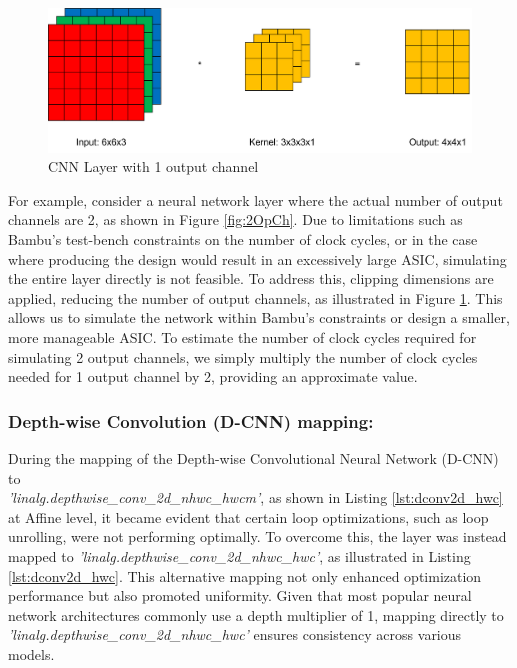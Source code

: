 \begin{figure}[H]
    \centering
    \includegraphics[width=0.7\linewidth]{figure//chapter3_implementation/Figure 7 - output channels 1.png}
    \caption{CNN Layer with 1 output channel}
    \label{fig:1OpCh}
\end{figure}

For example, consider a neural network layer where the actual number of output channels are 2, as shown in Figure \ref{fig:2OpCh}. Due to limitations such as Bambu's test-bench constraints on the number of clock cycles, or in the case where producing the design would result in an excessively large ASIC, simulating the entire layer directly is not feasible. To address this, clipping dimensions are applied, reducing the number of output channels, as illustrated in Figure \ref{fig:1OpCh}. This allows us to simulate the network within Bambu’s constraints or design a smaller, more manageable ASIC. To estimate the number of clock cycles required for simulating 2 output channels, we simply multiply the number of clock cycles needed for 1 output channel by 2, providing an approximate value.

\subsubsection{Depth-wise Convolution (D-CNN) mapping:}

During the mapping of the Depth-wise Convolutional Neural Network (D-CNN) to \\ \textit{'linalg.depthwise\_conv\_2d\_nhwc\_hwcm'}, as shown in Listing \ref{lst:dconv2d_hwc} at Affine level, it became evident that certain loop optimizations, such as loop unrolling, were not performing optimally. To overcome this, the layer was instead mapped to \textit{'linalg.depthwise\_conv\_2d\_nhwc\_hwc'}, as illustrated in Listing \ref{lst:dconv2d_hwc}. This alternative mapping not only enhanced optimization performance but also promoted uniformity. Given that most popular neural network architectures commonly use a depth multiplier of 1, mapping directly to \textit{'linalg.depthwise\_conv\_2d\_nhwc\_hwc'} ensures consistency across various models.

